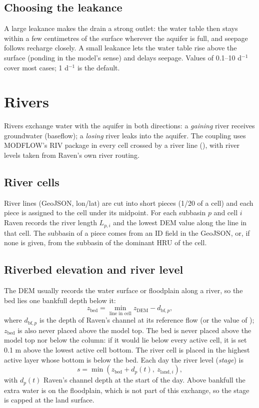 \subsection{Choosing the leakance}
A large leakance makes the drain a strong outlet: the water table then stays within a few centimetres of the surface wherever
the aquifer is full, and seepage follows recharge closely. A small leakance lets the water table rise above the surface
(ponding in the model's sense) and delays seepage. Values of 0.1--10 d$^{-1}$ cover most cases; 1 d$^{-1}$ is the default.

\section{Rivers}\label{ch:rivers}
Rivers exchange water with the aquifer in both directions: a \emph{gaining} river receives groundwater (baseflow); a
\emph{losing} river leaks into the aquifer. The coupling uses MODFLOW's RIV package in every cell crossed by a river line
(), with river levels taken from Raven's own river routing.

\subsection{River cells}
River lines (GeoJSON, lon/lat) are cut into short pieces (1/20 of a cell) and each piece is assigned to the cell under its
midpoint. For each subbasin $p$ and cell $i$ Raven records the river length $L_{p,i}$ and the lowest DEM value along the
line in that cell. The subbasin of a piece comes from an ID field in the GeoJSON, or, if none is given, from the subbasin
of the dominant HRU of the cell.

\subsection{Riverbed elevation and river level}
The DEM usually records the water surface or floodplain along a river, so the bed lies one bankfull depth below it:
\begin{equation}
z_{\mathrm{bed}}=\min_{\text{line in cell}}z_{\mathrm{DEM}}-d_{\mathrm{bf},p},
\end{equation}
where $d_{\mathrm{bf},p}$ is the depth of Raven's channel at its reference flow (or the value of );
$z_{\mathrm{bed}}$ is also never placed above the model top.
The bed is never placed above the model top nor below the column: if it would lie below every active cell, it is set
0.1 m above the lowest active cell bottom. The river cell is placed in the highest active layer whose bottom is below the
bed. Each day the river level (\emph{stage}) is
\begin{equation}
s=\min\!\left(z_{\mathrm{bed}}+d_p(t),\ z_{\mathrm{land},i}\right),
\end{equation}
with $d_p(t)$ Raven's channel depth at the start of the day. Above bankfull the extra water is on the floodplain, which
is not part of this exchange, so the stage is capped at the land surface.

